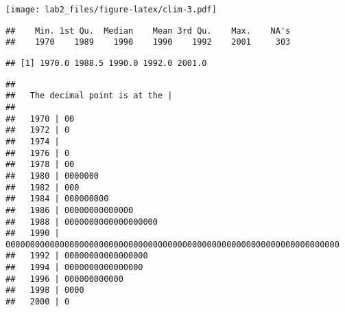 \documentclass[
]{article}
\newenvironment{Shaded}{\begin{snugshade}}{\end{snugshade}}
\newcommand{\CommentTok}[1]{\textcolor[rgb]{0.56,0.35,0.01}{\textit{#1}}}
\newcommand{\DataTypeTok}[1]{\textcolor[rgb]{0.13,0.29,0.53}{#1}}
\newcommand{\KeywordTok}[1]{\textcolor[rgb]{0.13,0.29,0.53}{\textbf{#1}}}
\newcommand{\NormalTok}[1]{#1}
\newcommand{\OperatorTok}[1]{\textcolor[rgb]{0.81,0.36,0.00}{\textbf{#1}}}
\newcommand{\StringTok}[1]{\textcolor[rgb]{0.31,0.60,0.02}{#1}}
\begin{document}
\begin{Shaded}
\end{Shaded}

\texttt{[image: lab2\_files/figure-latex/clim-3.pdf]}

\begin{Shaded}
\end{Shaded}

\begin{verbatim}
##    Min. 1st Qu.  Median    Mean 3rd Qu.    Max.    NA's 
##    1970    1989    1990    1990    1992    2001     303
\end{verbatim}

\begin{Shaded}
\end{Shaded}

\begin{verbatim}
## [1] 1970.0 1988.5 1990.0 1992.0 2001.0
\end{verbatim}

\begin{Shaded}
\end{Shaded}

\begin{verbatim}
## 
##   The decimal point is at the |
## 
##   1970 | 00
##   1972 | 0
##   1974 | 
##   1976 | 0
##   1978 | 00
##   1980 | 0000000
##   1982 | 000
##   1984 | 000000000
##   1986 | 00000000000000
##   1988 | 0000000000000000000
##   1990 | 00000000000000000000000000000000000000000000000000000000000000000000
##   1992 | 00000000000000000
##   1994 | 0000000000000000
##   1996 | 000000000000
##   1998 | 0000
##   2000 | 0
\end{verbatim}
\end{document}

